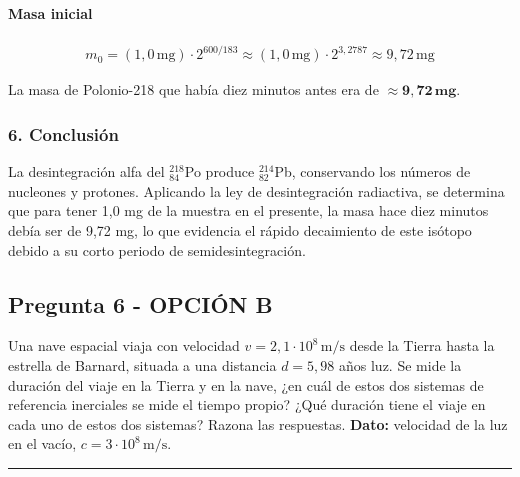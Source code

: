 \paragraph*{Masa inicial}
\begin{gather}
    m_0 = (1,0 \, \text{mg}) \cdot 2^{600/183} \approx (1,0 \, \text{mg}) \cdot 2^{3,2787} \approx 9,72 \, \text{mg}
\end{gather}
\begin{cajaresultado}
La masa de Polonio-218 que había diez minutos antes era de $\boldsymbol{\approx 9,72 \, \textbf{mg}}$.
\end{cajaresultado}

\subsubsection*{6. Conclusión}
\begin{cajaconclusion}
La desintegración alfa del $^{218}_{84}$Po produce $^{214}_{82}$Pb, conservando los números de nucleones y protones. Aplicando la ley de desintegración radiactiva, se determina que para tener 1,0 mg de la muestra en el presente, la masa hace diez minutos debía ser de 9,72 mg, lo que evidencia el rápido decaimiento de este isótopo debido a su corto periodo de semidesintegración.
\end{cajaconclusion}
\newpage

\subsection{Pregunta 6 - OPCIÓN B}
\label{subsec:6B_2025_jun_ord}

\begin{cajaenunciado}
Una nave espacial viaja con velocidad $v=2,1\cdot10^{8}\,\text{m/s}$ desde la Tierra hasta la estrella de Barnard, situada a una distancia $d=5,98$ años luz. Se mide la duración del viaje en la Tierra y en la nave, ¿en cuál de estos dos sistemas de referencia inerciales se mide el tiempo propio? ¿Qué duración tiene el viaje en cada uno de estos dos sistemas? Razona las respuestas.
\textbf{Dato:} velocidad de la luz en el vacío, $c=3\cdot10^{8}\,\text{m/s}$.
\end{cajaenunciado}
\hrule

